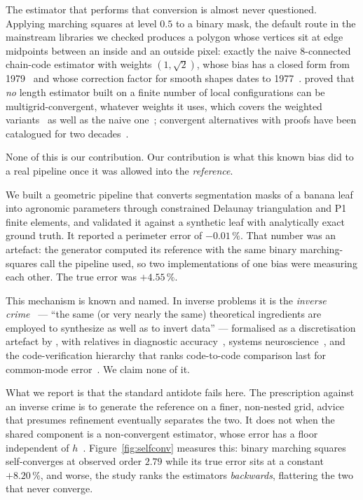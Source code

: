 \documentclass{article}
\newcommand{\pct}[1]{$#1\,\%$}
\begin{document}
The estimator that performs that conversion is almost never questioned. Applying
marching squares at level $0.5$ to a binary mask, the default route in the mainstream libraries
we checked produces a polygon whose vertices sit at edge midpoints between an inside and an
outside pixel: exactly the naive $8$-connected chain-code estimator with weights $(1,\sqrt2)$,
whose bias has a closed form from 1979~\citep{proffitt1979} and whose correction factor for smooth
shapes dates to 1977~\citep{kulpa1977}. \citet{tajine2003} proved that \emph{no} length estimator
built on a finite number of local configurations can be multigrid-convergent, whatever weights it
uses, which covers the weighted variants~\citep{dorst1987} as well as the naive
one~\citep{coeurjolly2012,coeurjolly2004,klette2004}; convergent alternatives with proofs have been
catalogued for two decades~\citep{kovalevsky1992,sloboda1998,lachaud2007,provencal2009}.

None of this is our contribution. Our contribution is what this known bias did to a real
pipeline once it was allowed into the \emph{reference}.

We built a geometric pipeline that converts segmentation masks of a banana leaf into agronomic
parameters through constrained Delaunay triangulation and P1 finite elements, and validated it
against a synthetic leaf with analytically exact ground truth. It reported a perimeter error of
\pct{-0.01}. That number was an artefact: the generator computed its reference with the same binary
marching-squares call the pipeline used, so two implementations of one bias were measuring each
other. The true error was \pct{+4.55}.

This mechanism is known and named. In inverse problems it is the \emph{inverse
crime}~\citep{coltonkress,wirgin2004} --- ``the same (or very nearly the same) theoretical
ingredients are employed to synthesize as well as to invert data'' --- formalised as a
discretisation artefact by \citet{kaipio2007}, with relatives in diagnostic
accuracy~\citep{whiting2011}, systems neuroscience~\citep{kriegeskorte2009}, and the
code-verification hierarchy that ranks code-to-code comparison last for common-mode
error~\citep{oberkampf2010}. We claim none of it.

What we report is that the standard antidote fails here. The prescription against an inverse crime
is to generate the reference on a finer, non-nested grid, advice that presumes refinement
eventually separates the two. It does not when the shared component is a non-convergent estimator,
whose error has a floor independent of $h$~\citep{tajine2003}. Figure~\ref{fig:selfconv} measures
this: binary marching squares self-converges at observed order $2.79$ while its true error sits at
a constant \pct{+8.20}, and worse, the study ranks the estimators \emph{backwards}, flattering the
two that never converge.
\end{document}
